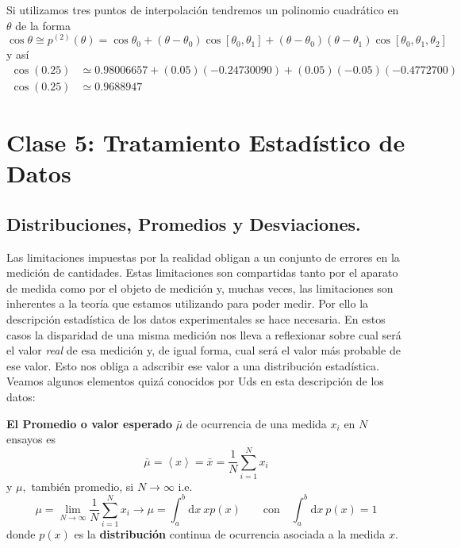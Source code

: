 \documentclass[spanish,titlepage,11pt]{article}
\begin{document}
Si utilizamos tres puntos de interpolaci\'{o}n tendremos un polinomio
cuadr\'{a}tico en $\theta$ de la forma
\[
\cos\theta\cong p^{(2)}(\theta)=\cos\theta_{0}+\left(  \theta-\theta
_{0}\right)  \cos\left[  \theta_{0},\theta_{1}\right]  +\left(  \theta
-\theta_{0}\right)  \left(  \theta-\theta_{1}\right)  \cos\left[  \theta
_{0},\theta_{1},\theta_{2}\right]
\]
y as\'{i}
\begin{align*}
\cos\left(  0.25\right)   &  \simeq0.98006657+\left(  0.05\right)  \left(
-0.24730090\right)  +\left(  0.05\right)  \left(  -0.05\right)  \left(
-0.4772700\right) \\
\cos(0.25)  &  \simeq0.9688947
\end{align*}

\newpage

\section{\textbf{Clase 5: Tratamiento Estad\'{i}stico de Datos}}

\subsection{Distribuciones, Promedios y Desviaciones.}

Las limitaciones impuestas por la realidad obligan a un conjunto de errores en
la medici\'{o}n de cantidades. Estas limitaciones son compartidas tanto por el
aparato de medida como por el objeto de medici\'{o}n y, muchas veces, las
limitaciones son inherentes a la teor\'{i}a que estamos utilizando para poder
medir. Por ello la descripci\'{o}n estad\'{i}stica de los datos experimentales
se hace necesaria. En estos casos la disparidad de una misma medici\'{o}n nos
lleva a reflexionar sobre cual ser\'{a} el valor \textit{real} de esa
medici\'{o}n y, de igual forma, cual ser\'{a} el valor m\'{a}s probable de ese
valor. Esto nos obliga a adscribir ese valor a una distribuci\'{o}n
estad\'{i}stica. Veamos algunos elementos quiz\'{a} conocidos por Uds en esta
descripci\'{o}n de los datos:

\textbf{El Promedio o valor esperado }$\bar{\mu}$ de ocurrencia de una medida
$x_{i}$ en $N$ ensayos es
\[
\bar{\mu}=\left\langle x\right\rangle =\bar{x}=\frac{1}{N}\sum_{i=1}^{N}x_{i}
\]
y $\mu,$ tambi\'{e}n promedio, si $N\rightarrow\infty$ i.e.
\[
\mu=\lim_{N\rightarrow\infty}\frac{1}{N}\sum_{i=1}^{N}x_{i}\rightarrow\mu
=\int_{a}^{b}\mathrm{d}x\ xp(x)\qquad\mathrm{con}\quad\int_{a}^{b}%
\mathrm{d}x\ p(x)=1
\]
donde $p(x)$ es la \textbf{distribuci\'{o}n} continua de ocurrencia asociada a
la medida $x.$
\end{document}
